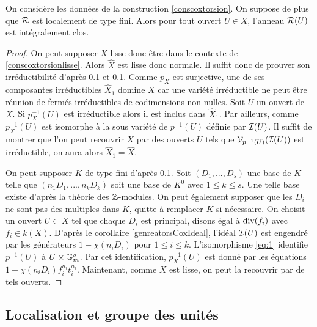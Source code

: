 \begin{thm}
On considère les données de la construction \ref{conscoxtorsion}. On suppose de plus que $\mathcal{R}$ est localement de type fini. Alors pour tout ouvert $U\in X$, l'anneau $\mathcal{R}(U)$ est intégralement clos.
\end{thm}
\begin{proof}
On peut supposer $X$ lisse donc être dans le contexte de \ref{conscoxtorsionlisse}. Alors $\widehat{X}$ est lisse donc normale. Il suffit donc de prouver son irréductibilité d'après \ref{} et \ref{}. Comme $p_X$ est surjective, une de ses composantes irréductibles $\widehat{X}_1$ domine $X$ car une variété irréductible ne peut être réunion de fermés irréductibles de codimensions non-nulles. Soit $U$ un ouvert de $X$. Si $p_X^{-1}(U)$ est irréductible alors il est inclus dans $\widehat{X}_1$. Par ailleurs, comme $p_X^{-1}(U)$ est isomorphe à la sous variété de $p^{-1}(U)$ définie par $\mathcal{I}(U)$. Il suffit de montrer que l'on peut recouvrir $X$ par des ouverts $U$ tels que $\mathcal{V}_{p^{-1}(U)}(\mathcal{I}(U))$ est irréductible, on aura alors $\widehat{X}_1=\widehat{X}$.

On peut supposer $K$ de type fini d'après \ref{}. Soit $(D_1,...,D_s)$ une base de $K$ telle que $(n_1D_1,...,n_kD_k)$ soit une base de $K^0$ avec $1\leq k\leq s$. Une telle base existe d'après la théorie des $\mathbb{Z}$-modules. On peut également supposer que les $D_i$ ne sont pas des multiples dans $K$, quitte à remplacer $K$ si nécessaire. On choisit un ouvert $U\subset X$ tel que chaque $D_i$ est principal, disons égal à $\operatorname{div}(f_i)$ avec $f_i\in k(X)$. D'après le corollaire \ref{genreatorsCoxIdeal}, l'idéal $\mathcal{I}(U)$ est engendré par les générateurs $1-\chi(n_iD_i)$ pour $1\leq i\leq k$. L'isomorphisme \ref{eq:1} identifie $p^{-1}(U)$ à $U\times \mathbb{G}_m^s$. Par cet identification, $p_X^{-1}(U)$ est donné par les équations $1-\chi(n_iD_i)f_i^{n_i}t_i^{n_i}$. 
Maintenant, comme $X$ est lisse, on peut la recouvrir par de tels ouverts.
\end{proof}

\subsection{Localisation et groupe des unités}

